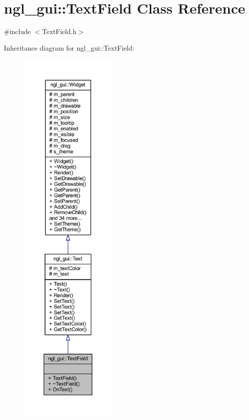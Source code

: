 \hypertarget{classngl__gui_1_1_text_field}{}\section{ngl\+\_\+gui\+:\+:Text\+Field Class Reference}
\label{classngl__gui_1_1_text_field}


{\ttfamily \#include $<$Text\+Field.\+h$>$}



Inheritance diagram for ngl\+\_\+gui\+:\+:Text\+Field\+:\nopagebreak
\begin{figure}[H]
\begin{center}
\leavevmode
\includegraphics[height=550pt]{classngl__gui_1_1_text_field__inherit__graph}
\end{center}
\end{figure}


